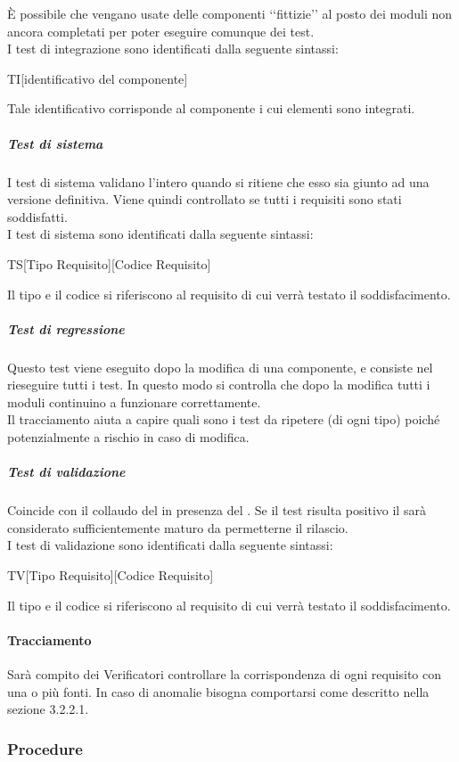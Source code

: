 			È possibile che vengano usate delle componenti ‘‘fittizie’’ al posto dei moduli non ancora completati per poter eseguire comunque dei test. \\
			I test di integrazione sono identificati dalla seguente sintassi:
			\begin{center}
				TI[identificativo del componente]
			\end{center}
			Tale identificativo corrisponde al componente i cui elementi sono integrati.
			\subparagraph{Test di sistema}
			I test di sistema validano l'intero   quando si ritiene che esso sia giunto ad una versione definitiva. Viene quindi controllato se tutti i requisiti sono stati soddisfatti. \\
			I test di sistema sono identificati dalla seguente sintassi:
			\begin{center}
				TS[Tipo Requisito][Codice Requisito]
			\end{center}
			Il tipo e il codice si riferiscono al requisito di cui verrà testato il soddisfacimento.
			\subparagraph{Test di regressione}
			Questo test viene eseguito dopo la modifica di una componente, e consiste nel rieseguire tutti i test. In questo modo si controlla che dopo la modifica tutti i moduli continuino a funzionare correttamente. \\
			Il tracciamento aiuta a capire quali sono i test da ripetere (di ogni tipo) poiché potenzialmente a rischio in caso di modifica.
			\subparagraph{Test di validazione}
			Coincide con il collaudo del  in presenza del . Se il test risulta positivo il  sarà considerato sufficientemente maturo da permetterne il rilascio. \\
			I test di validazione sono identificati dalla seguente sintassi:
			\begin{center}
				TV[Tipo Requisito][Codice Requisito]
			\end{center}
			Il tipo e il codice si riferiscono al requisito di cui verrà testato il soddisfacimento.
		\paragraph{Tracciamento}
		Sarà compito dei Verificatori controllare la corrispondenza di ogni requisito con una o più fonti. In caso di anomalie bisogna comportarsi come descritto nella sezione 3.2.2.1. %
\subsubsection{Procedure}
